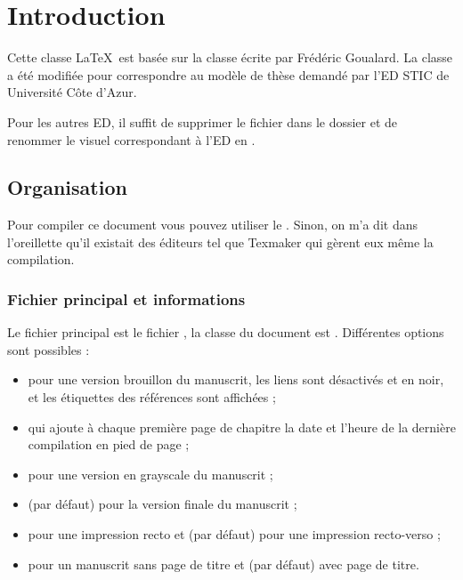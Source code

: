 
\chapter{Introduction}

Cette classe \LaTeX\ est basée sur la classe  écrite par Frédéric Goualard. La classe a été modifiée pour correspondre au modèle de thèse demandé par l'ED STIC de Université Côte d'Azur.

Pour les autres ED, il suffit de supprimer le fichier  dans le dossier  et de renommer le visuel correspondant à l'ED en .

\section{Organisation}
  
  Pour compiler ce document vous pouvez utiliser le . Sinon, on m'a dit dans l'oreillette qu'il existait des éditeurs tel que Texmaker qui gèrent eux même la compilation.

  \subsection{Fichier principal et informations}
  Le fichier principal est le fichier , la classe du document est . 
  Différentes options sont possibles :
  \begin{itemize}
    \item {} pour une version brouillon du manuscrit, les liens sont désactivés et en noir, et les étiquettes des références sont affichées ;
    \item {} qui ajoute à chaque première page de chapitre la date et l'heure de la dernière compilation en pied de page ;
    \item {} pour une version en grayscale du manuscrit ;
    \item {} (par défaut) pour la version finale du manuscrit ;
    \item {} pour une impression recto et  (par défaut) pour une impression recto-verso ;
    \item {} pour un manuscrit sans page de titre et  (par défaut) avec page de titre.
  \end{itemize}
  
